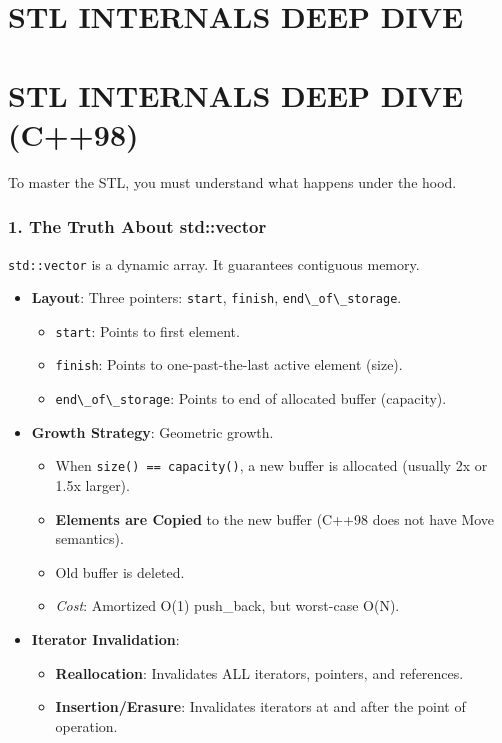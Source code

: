 \hypertarget{stl-internals-deep-dive}{%
\chapter{STL INTERNALS DEEP DIVE}\label{stl-internals-deep-dive}}

\hypertarget{stl-internals-deep-dive-c98}{%
\chapter{STL INTERNALS DEEP DIVE
(C++98)}\label{stl-internals-deep-dive-c98}}

To master the STL, you must understand what happens under the hood.

\hypertarget{the-truth-about-stdvector}{%
\subsection{1. The Truth About
std::vector}\label{the-truth-about-stdvector}}

\passthrough{\lstinline!std::vector!} is a dynamic array. It guarantees
contiguous memory.

\begin{itemize}
\tightlist
\item
  \textbf{Layout}: Three pointers: \passthrough{\lstinline!start!},
  \passthrough{\lstinline!finish!},
  \passthrough{\lstinline!end\_of\_storage!}.

  \begin{itemize}
  \tightlist
  \item
    \passthrough{\lstinline!start!}: Points to first element.
  \item
    \passthrough{\lstinline!finish!}: Points to one-past-the-last active
    element (size).
  \item
    \passthrough{\lstinline!end\_of\_storage!}: Points to end of
    allocated buffer (capacity).
  \end{itemize}
\item
  \textbf{Growth Strategy}: Geometric growth.

  \begin{itemize}
  \tightlist
  \item
    When \passthrough{\lstinline!size() == capacity()!}, a new buffer is
    allocated (usually 2x or 1.5x larger).
  \item
    \textbf{Elements are Copied} to the new buffer (C++98 does not have
    Move semantics).
  \item
    Old buffer is deleted.
  \item
    \emph{Cost}: Amortized O(1) push\_back, but worst-case O(N).
  \end{itemize}
\item
  \textbf{Iterator Invalidation}:

  \begin{itemize}
  \tightlist
  \item
    \textbf{Reallocation}: Invalidates ALL iterators, pointers, and
    references.
  \item
    \textbf{Insertion/Erasure}: Invalidates iterators at and after the
    point of operation.
  \end{itemize}
\end{itemize}

